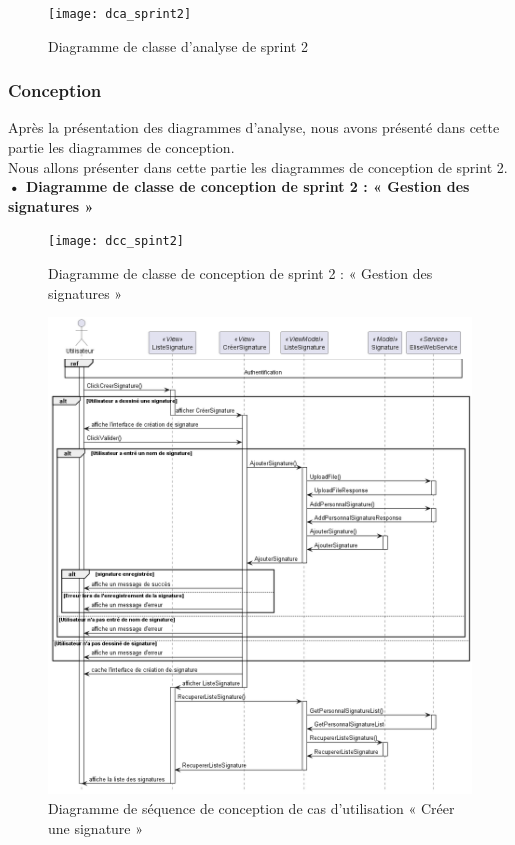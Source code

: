 \begin{figure}
  \centering
  \texttt{[image: dca\_sprint2]}
  \caption{Diagramme de classe d'analyse de sprint 2}
  \label{fig:class_analyse_signatures}
\end{figure}


\subsubsection{Conception}

Après la présentation des diagrammes d'analyse, nous avons présenté dans cette partie les diagrammes de conception.\\ 
Nous allons présenter dans cette partie les diagrammes de conception de sprint 2. \\
\textbf{•	Diagramme de classe de conception de sprint 2 : « Gestion des signatures »}

\begin{figure}[H]
  \centering
  \texttt{[image: dcc\_spint2]}
  \caption{Diagramme de classe de conception de sprint 2 : « Gestion des signatures »}
  \label{fig:class_diagram_signatures}
\end{figure}


\begin{figure}[H]
  \centering
  \includegraphics[width=1\textwidth]{out/diagrams/signatures/sequence_create/sequence_create_signature}
  \caption{Diagramme de séquence de conception de cas d'utilisation « Créer une signature  »}
  \label{fig:sequence_conception_create_signature}
\end{figure}

